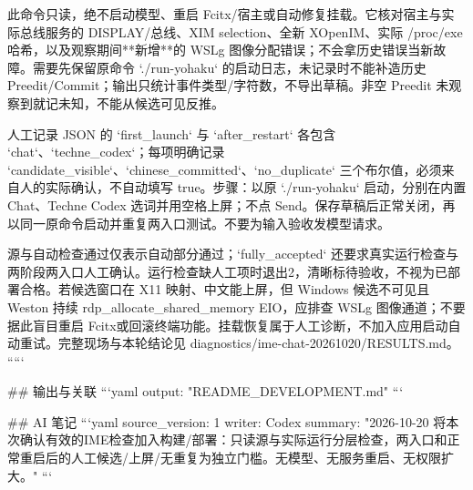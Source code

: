 此命令只读，绝不启动模型、重启 Fcitx/宿主或自动修复挂载。它核对宿主与实际总线服务的 DISPLAY/总线、XIM selection、全新 XOpenIM、实际 /proc/exe 哈希，以及观察期间**新增**的 WSLg 图像分配错误；不会拿历史错误当新故障。需要先保留原命令 `./run-yohaku` 的启动日志，未记录时不能补造历史 Preedit/Commit；输出只统计事件类型/字符数，不导出草稿。非空 Preedit 未观察到就记未知，不能从候选可见反推。

人工记录 JSON 的 `first_launch` 与 `after_restart` 各包含 `chat`、`techne_codex`；每项明确记录 `candidate_visible`、`chinese_committed`、`no_duplicate` 三个布尔值，必须来自人的实际确认，不自动填写 true。步骤：以原 `./run-yohaku` 启动，分别在内置 Chat、Techne Codex 选词并用空格上屏；不点 Send。保存草稿后正常关闭，再以同一原命令启动并重复两入口测试。不要为输入验收发模型请求。

源与自动检查通过仅表示自动部分通过；`fully_accepted` 还要求真实运行检查与两阶段两入口人工确认。运行检查缺人工项时退出2，清晰标待验收，不视为已部署合格。若候选窗口在 X11 映射、中文能上屏，但 Windows 候选不可见且 Weston 持续 rdp_allocate_shared_memory EIO，应排查 WSLg 图像通道；不要据此盲目重启 Fcitx或回滚终端功能。挂载恢复属于人工诊断，不加入应用启动自动重试。完整现场与本轮结论见 diagnostics/ime-chat-20261020/RESULTS.md。
`````

## 输出与关联
```yaml
output: "README_DEVELOPMENT.md"
```

## AI 笔记
```yaml
source_version: 1
writer: Codex
summary: "2026-10-20 将本次确认有效的IME检查加入构建/部署：只读源与实际运行分层检查，两入口和正常重启后的人工候选/上屏/无重复为独立门槛。无模型、无服务重启、无权限扩大。"
```
